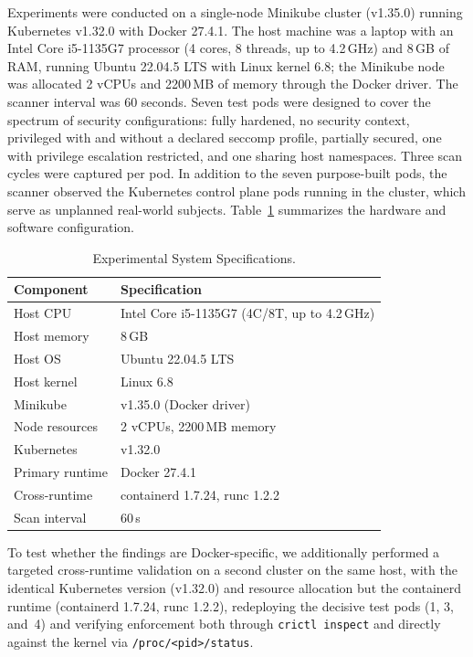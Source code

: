 \documentclass[sigconf]{acmart}
\begin{document}
Experiments were conducted on a single-node Minikube cluster (v1.35.0) running Kubernetes v1.32.0 with Docker 27.4.1. The host machine was a laptop with an Intel Core i5-1135G7 processor (4 cores, 8 threads, up to 4.2\,GHz) and 8\,GB of RAM, running Ubuntu 22.04.5 LTS with Linux kernel 6.8; the Minikube node was allocated 2 vCPUs and 2200\,MB of memory through the Docker driver. The scanner interval was 60 seconds. Seven test pods were designed to cover the spectrum of security configurations: fully hardened, no security context, privileged with and without a declared seccomp profile, partially secured, one with privilege escalation restricted, and one sharing host namespaces. Three scan cycles were captured per pod. In addition to the seven purpose-built pods, the scanner observed the Kubernetes control plane pods running in the cluster, which serve as unplanned real-world subjects. Table~\ref{tab:specs} summarizes the hardware and software configuration.

\begin{table}[htbp]
\caption{Experimental System Specifications.}
\label{tab:specs}
\centering
\begin{tabular}{ll}
\toprule
\textbf{Component} & \textbf{Specification} \\
\midrule
Host CPU        & Intel Core i5-1135G7 (4C/8T, up to 4.2\,GHz) \\
Host memory     & 8\,GB \\
Host OS         & Ubuntu 22.04.5 LTS \\
Host kernel     & Linux 6.8 \\
Minikube        & v1.35.0 (Docker driver) \\
Node resources  & 2 vCPUs, 2200\,MB memory \\
Kubernetes      & v1.32.0 \\
Primary runtime & Docker 27.4.1 \\
Cross-runtime   & containerd 1.7.24, runc 1.2.2 \\
Scan interval   & 60\,s \\
\bottomrule
\end{tabular}
\end{table}

To test whether the findings are Docker-specific, we additionally performed a targeted cross-runtime validation on a second cluster on the same host, with the identical Kubernetes version (v1.32.0) and resource allocation but the containerd runtime (containerd 1.7.24, runc 1.2.2), redeploying the decisive test pods (1, 3, and~4) and verifying enforcement both through \texttt{crictl inspect} and directly against the kernel via \texttt{/proc/<pid>/status}.
\end{document}
